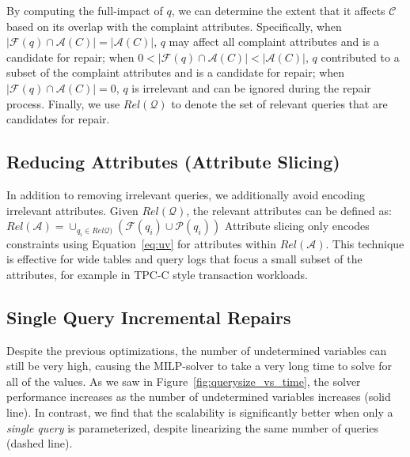 By computing the full-impact of $q$, we can determine the extent that it affects $\mathcal{C}$
based on its overlap with the complaint attributes.
Specifically, 
when $|\mathcal{F}(q) \cap \mathcal{A}(C)|=|\mathcal{A}(C)|$, $q$ may affect all complaint attributes and is a candidate for repair; 
when $0 < |\mathcal{F}(q) \cap \mathcal{A}(C)| < |\mathcal{A}(C)|$, 
$q$ contributed to a subset of the complaint attributes and is a candidate for repair;
when $|\mathcal{F}(q) \cap \mathcal{A}(C)|=0$, $q$ is irrelevant 
and can be ignored during the repair process.
Finally, we use $Rel\mathcal{(Q)}$ to denote the set of relevant queries that are candidates for repair.

\subsection{Reducing Attributes (Attribute Slicing)}

In addition to removing irrelevant queries, we additionally avoid encoding irrelevant attributes.
Given $Rel\mathcal{(Q)}$, the relevant attributes can be defined as:
$Rel\mathcal{(A)} = \cup_{q_i \in Rel\mathcal{Q)}} (\mathcal{F}(q_i)\cup \mathcal{P}(q_i))$
Attribute slicing only encodes constraints using Equation~\ref{eq:uv} for attributes within $Rel\mathcal{(A)}$.
This technique is effective for wide tables and query logs that focus a small subset of the attributes, for example
in TPC-C style transaction workloads.



\subsection{Single Query Incremental Repairs}

Despite the previous optimizations, the number of undetermined variables can still be very high, causing 
the MILP-solver to take a very long time to solve for all of the values.  As we saw in
Figure~\ref{fig:querysize_vs_time}, the solver performance increases 
as the number of undetermined variables increases (solid line).
In contrast, we find that the scalability is significantly better when only a {\it single query}
is parameterized, despite linearizing the same number of queries (dashed line).

